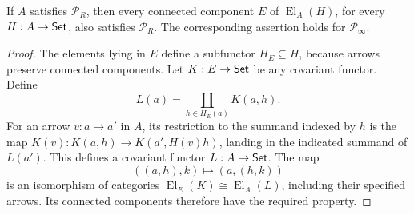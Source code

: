 \begin{lemma}\label{C:inherit-elements}
If $A$ satisfies $\mathcal P_R$, then every connected component $E$ of $\operatorname{El}_A(H)$, for every $H:A\to\mathsf{Set}$, also satisfies $\mathcal P_R$. The corresponding assertion holds for $\mathcal P_\infty$.
\end{lemma}
\begin{proof}
The elements lying in $E$ define a subfunctor $H_E\subseteq H$, because arrows preserve connected components. Let $K:E\to\mathsf{Set}$ be any covariant functor. Define
\[
 L(a)=\coprod_{h\in H_E(a)}K(a,h).
\]
For an arrow $v:a\to a'$ in $A$, its restriction to the summand indexed by $h$ is the map $K(v):K(a,h)\to K(a',H(v)h)$, landing in the indicated summand of $L(a')$. This defines a covariant functor $L:A\to\mathsf{Set}$. The map
\[
 ((a,h),k)\longmapsto (a,(h,k))
\]
is an isomorphism of categories $\operatorname{El}_E(K)\cong\operatorname{El}_A(L)$, including their specified arrows. Its connected components therefore have the required property.
\end{proof}

